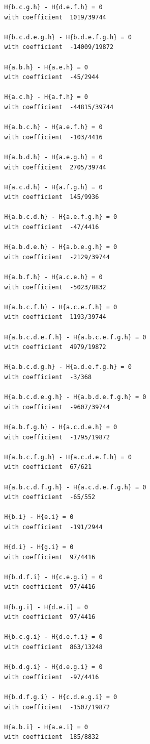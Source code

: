 \documentclass[11pt, a4paper]{kybernetika}
\begin{document}
\begin{verbatim}
		H{b.c.g.h} - H{d.e.f.h} = 0
		with coefficient  1019/39744
		
		H{b.c.d.e.g.h} - H{b.d.e.f.g.h} = 0
		with coefficient  -14009/19872
		
		H{a.b.h} - H{a.e.h} = 0
		with coefficient  -45/2944
		
		H{a.c.h} - H{a.f.h} = 0
		with coefficient  -44815/39744
		
		H{a.b.c.h} - H{a.e.f.h} = 0
		with coefficient  -103/4416
		
		H{a.b.d.h} - H{a.e.g.h} = 0
		with coefficient  2705/39744
		
		H{a.c.d.h} - H{a.f.g.h} = 0
		with coefficient  145/9936
		
		H{a.b.c.d.h} - H{a.e.f.g.h} = 0
		with coefficient  -47/4416
		
		H{a.b.d.e.h} - H{a.b.e.g.h} = 0
		with coefficient  -2129/39744
		
		H{a.b.f.h} - H{a.c.e.h} = 0
		with coefficient  -5023/8832
		
		H{a.b.c.f.h} - H{a.c.e.f.h} = 0
		with coefficient  1193/39744
		
		H{a.b.c.d.e.f.h} - H{a.b.c.e.f.g.h} = 0
		with coefficient  4979/19872
		
		H{a.b.c.d.g.h} - H{a.d.e.f.g.h} = 0
		with coefficient  -3/368
		
		H{a.b.c.d.e.g.h} - H{a.b.d.e.f.g.h} = 0
		with coefficient  -9607/39744
		
		H{a.b.f.g.h} - H{a.c.d.e.h} = 0
		with coefficient  -1795/19872
		
		H{a.b.c.f.g.h} - H{a.c.d.e.f.h} = 0
		with coefficient  67/621
		
		H{a.b.c.d.f.g.h} - H{a.c.d.e.f.g.h} = 0
		with coefficient  -65/552
		
		H{b.i} - H{e.i} = 0
		with coefficient  -191/2944
		
		H{d.i} - H{g.i} = 0
		with coefficient  97/4416
		
		H{b.d.f.i} - H{c.e.g.i} = 0
		with coefficient  97/4416
		
		H{b.g.i} - H{d.e.i} = 0
		with coefficient  97/4416
		
		H{b.c.g.i} - H{d.e.f.i} = 0
		with coefficient  863/13248
		
		H{b.d.g.i} - H{d.e.g.i} = 0
		with coefficient  -97/4416
		
		H{b.d.f.g.i} - H{c.d.e.g.i} = 0
		with coefficient  -1507/19872
		
		H{a.b.i} - H{a.e.i} = 0
		with coefficient  185/8832
		

\end{verbatim}
\end{document}

